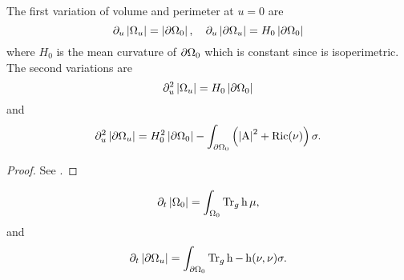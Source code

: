 \documentclass{amsart}
\begin{document}
\begin{lemma}
\label{lem:spatial_variation}
The first variation of volume and perimeter at \(u = 0\) are
\[
\partial_u \left|{\Omega_u}\right| = \left|{\partial {\Omega_0}}\right|, \quad \partial_u \left|{\partial {\Omega_u}}\right| = H_0 \left|{\partial {\Omega_0}}\right|
\]
where \(H_0\) is the mean curvature of \(\partial {\Omega_0}\) which is constant since is isoperimetric. The second variations are
\[
\partial_u^2 \left|{\Omega_u}\right| = H_0 \left|{\partial {\Omega_0}}\right|
\]
and
\[
\partial_u^2 \left|{\partial {\Omega_u}}\right| = H_0^2 \left|{\partial {\Omega_0}}\right| - \int_{\partial {\Omega_0}} \left(\left|{\operatorname{A}}\right|^2 + \operatorname{Ric}(\nu)\right) \sigma.
\]
\end{lemma}

\begin{proof}
See \cite[Chapter 1]{Li:/2012}.
\end{proof}

\begin{lemma}
\label{lem:time_variation}
\[
\partial_t \left|{\Omega_0}\right| = \int_{\Omega_0} \operatorname{Tr}_g \operatorname{h} \mu,
\]
and
\[
\partial_t \left|{\partial {\Omega_u}}\right| = \int_{\partial {\Omega_0}} \operatorname{Tr}_g \operatorname{h} - \operatorname{h}(\nu, \nu) \sigma.
\]
\end{lemma}
\end{document}
